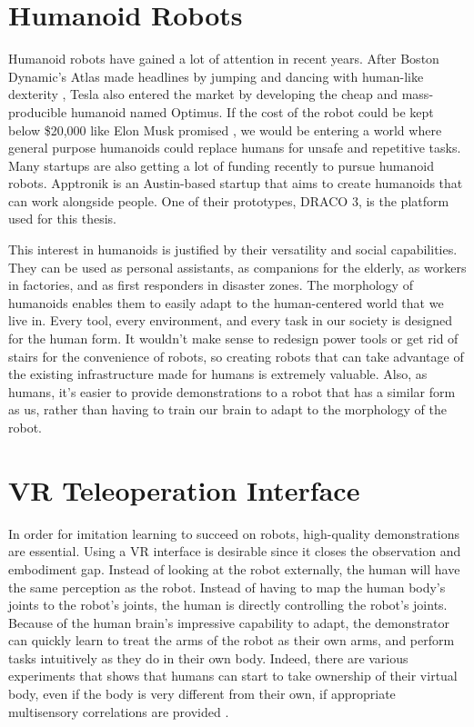 \section{Humanoid Robots}
Humanoid robots have gained a lot of attention in recent years. After Boston Dynamic's Atlas made headlines by jumping and dancing with human-like dexterity \cite{atlas}, Tesla also entered the market by developing the cheap and mass-producible humanoid named Optimus. If the cost of the robot could be kept below \$20,000 like Elon Musk promised \cite{teslabot}, we would be entering a world where general purpose humanoids could replace humans for unsafe and repetitive tasks. Many startups are also getting a lot of funding recently to pursue humanoid robots. Apptronik is an Austin-based startup that aims to create humanoids that can work alongside people. One of their prototypes, DRACO 3, is the platform used for this thesis.

This interest in humanoids is justified by their versatility and social capabilities. They can be used as personal assistants, as companions for the elderly, as workers in factories, and as first responders in disaster zones. The morphology of humanoids enables them to easily adapt to the human-centered world that we live in. Every tool, every environment, and every task in our society is designed for the human form. It wouldn't make sense to redesign power tools or get rid of stairs for the convenience of robots, so creating robots that can take advantage of the existing infrastructure made for humans is extremely valuable. Also, as humans, it's easier to provide demonstrations to a robot that has a similar form as us, rather than having to train our brain to adapt to the morphology of the robot.

\section {VR Teleoperation Interface}
In order for imitation learning to succeed on robots, high-quality demonstrations are essential. Using a VR interface is desirable since it closes the observation and embodiment gap. Instead of looking at the robot externally, the human will have the same perception as the robot. Instead of having to map the human body's joints to the robot's joints, the human is directly controlling the robot's joints. Because of the human brain's impressive capability to adapt, the demonstrator can quickly learn to treat the arms of the robot as their own arms, and perform tasks intuitively as they do in their own body. Indeed, there are various experiments that shows that humans can start to take ownership of their virtual body, even if the body is very different from their own, if appropriate multisensory correlations are provided \cite{10.3389/fnhum.2015.00141} \cite{10.3389/neuro.09.006.2008}. 

